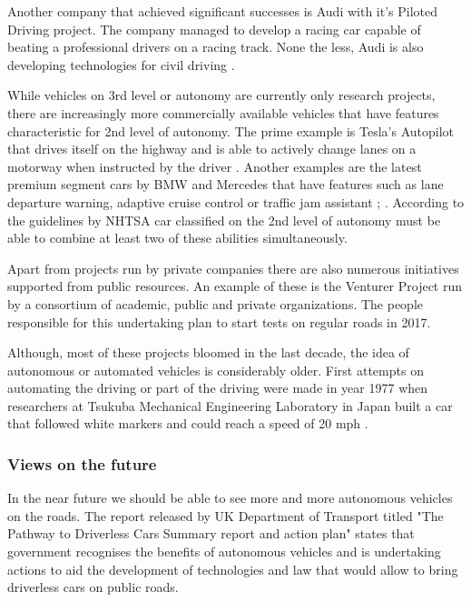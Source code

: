 \documentclass[11pt,english]{article}
\begin{document}
\par
Another company that achieved significant successes is Audi with it's Piloted Driving project. The company managed to develop a racing car capable of beating a professional drivers on a racing track. None the less, Audi is also developing technologies for civil driving \citep{audi1}.

\par


While vehicles on 3rd level or autonomy are currently only research projects, there are increasingly more commercially available vehicles that have features characteristic for 2nd level of autonomy. The prime example is Tesla's Autopilot that drives itself on the highway and is able to actively change lanes on a motorway when instructed by the driver \citep{tesla2}. Another examples are the latest premium segment cars by BMW and Mercedes that have features such as lane departure warning, adaptive cruise control or traffic jam assistant \citep{bmw}; \citep{mercedes1}. According to the guidelines by NHTSA car classified on the 2nd level of autonomy must be able to combine at least two of these abilities simultaneously.


\par

Apart from projects run by private companies there are also numerous initiatives supported from public resources. An example of these is the Venturer Project run by a consortium of academic, public and private  organizations. The people responsible for this undertaking plan to start tests on regular roads in 2017.

\par
Although, most of these projects bloomed in the last decade, the idea of autonomous or automated vehicles is considerably older. First attempts on automating the driving or part of the driving were made in year 1977 when researchers at Tsukuba Mechanical Engineering Laboratory in Japan built a car that followed white markers and could reach a speed of 20 mph \citep{forrest2007autonomous}.
\par




\subsubsection{Views on the future}


In the near future we should be able to see more and more autonomous vehicles on the roads.
The report released by UK Department of Transport titled "The Pathway to Driverless Cars Summary report and action plan" \citep{pathwaytodriverless} states that government recognises the benefits of autonomous vehicles and is undertaking actions to aid the development of technologies and law that would allow to bring driverless cars on public roads. 
\end{document}

